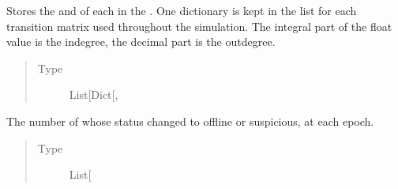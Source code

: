 \documentclass[letterpaper,10pt,english]{sphinxmanual}
\begin{document}
\begin{fulllineitems}
\begin{fulllineitems}
\label{\detokenize{app.domain.helpers:app.domain.helpers.smart_dataclasses.LoggingData.matrices_nodes_degrees}}
Stores the  and  of each
{\hyperref[\detokenize{app.domain:module-app.domain.network_nodes}]{}} in the
{\hyperref[\detokenize{app.domain:module-app.domain.cluster_groups}]{}}. One dictionary
is kept in the list for each transition matrix used throughout
the simulation. The integral part of the float value is the
in\sphinxhyphen{}degree, the decimal part is the out\sphinxhyphen{}degree.
\begin{quote}\begin{description}
\item[{Type}] \leavevmode
List{[}Dict{[}, \sphinxhref{https://docs.python.org/3.7/library/functions.html\#float}{float}{]}{]}

\end{description}\end{quote}

\end{fulllineitems}


\begin{fulllineitems}
\label{\detokenize{app.domain.helpers:app.domain.helpers.smart_dataclasses.LoggingData.off_node_count}}
The number of {\hyperref[\detokenize{app.domain:module-app.domain.network_nodes}]{}}
whose status changed to offline or suspicious, at each epoch.
\begin{quote}\begin{description}
\item[{Type}] \leavevmode
List{[}\sphinxhref{https://docs.python.org/3.7/library/functions.html\#int}{int}{]}

\end{description}\end{quote}

\end{fulllineitems}


\end{fulllineitems}
\end{document}
